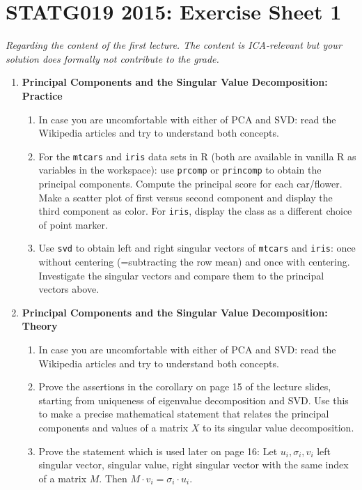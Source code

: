 \documentclass[a4paper,10pt,oneside]{article}
\begin{document}
\section*{STATG019 2015: Exercise Sheet 1}
{\em Regarding the content of the first lecture. The content is ICA-relevant but your solution does formally not contribute to the grade.}

\begin{enumerate}

\item {\bf Principal Components and the Singular Value Decomposition: Practice}
\begin{enumerate}
\item In case you are uncomfortable with either of PCA and SVD: read the Wikipedia articles and try to understand both concepts.
\item For the \texttt{mtcars} and \texttt{iris} data sets in R (both are available in vanilla R as variables in the workspace): use \texttt{prcomp} or \texttt{princomp} to obtain the principal components. Compute the principal score for each car/flower. Make a scatter plot of first versus second component and display the third component as color. For \texttt{iris}, display the class as a different choice of point marker.
\item Use \texttt{svd} to obtain left and right singular vectors of \texttt{mtcars} and \texttt{iris}: once without centering (=subtracting the row mean) and once with centering. Investigate the singular vectors and compare them to the principal vectors above.
\end{enumerate}

\item {\bf Principal Components and the Singular Value Decomposition: Theory}
\begin{enumerate}
\item In case you are uncomfortable with either of PCA and SVD: read the Wikipedia articles and try to understand both concepts.
\item Prove the assertions in the corollary on page 15 of the lecture slides, starting from uniqueness of eigenvalue decomposition and SVD. Use this to make a precise mathematical statement that relates the principal components and values of a matrix $X$ to its singular value decomposition.
\item Prove the statement which is used later on page 16: Let $u_i,\sigma_i,v_i$ left singular vector, singular value, right singular vector with the same index of a matrix $M$. Then $M \cdot v_i = \sigma_i \cdot u_i.$
\end{enumerate}


\end{enumerate}
\end{document}
